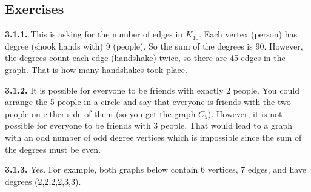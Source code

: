 \documentclass[12pt,]{book}
\theoremstyle{plain}
\theoremstyle{definition}
\theoremstyle{definition}
\theoremstyle{definition}
\numberwithin{equation}{chapter}
\begin{document}
\subsection*{ Exercises}
\noindent\textbf{3.1.1.} \hypertarget{p-1585}{}%
This is asking for the number of edges in \(K_{10}\). Each vertex (person) has degree (shook hands with) 9 (people). So the sum of the degrees is \(90\). However, the degrees count each edge (handshake) twice, so there are 45 edges in the graph. That is how many handshakes took place.%
\par\smallskip
\noindent\textbf{3.1.2.} \hypertarget{p-1587}{}%
It is possible for everyone to be friends with exactly 2 people. You could arrange the 5 people in a circle and say that everyone is friends with the two people on either side of them (so you get the graph \(C_5\)). However, it is not possible for everyone to be friends with 3 people. That would lead to a graph with an odd number of odd degree vertices which is impossible since the sum of the degrees must be even.%
\par\smallskip
\noindent\textbf{3.1.3.} \hypertarget{p-1589}{}%
Yes. For example, both graphs below contain 6 vertices, 7 edges, and have degrees (2,2,2,2,3,3).%
\end{document}
